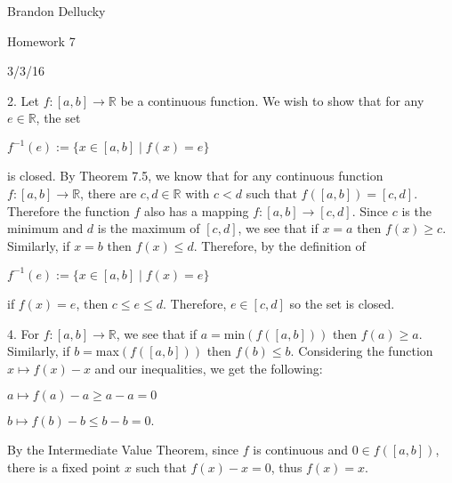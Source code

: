 \documentclass[12pt]{article}
\begin{document}
\centerline{Brandon Dellucky}
\centerline{Homework 7}
\centerline{3/3/16}
\centerline{}

2. Let $f: [a,b] \rightarrow  \mathbb{R}$ be a continuous function. We wish to show that for any $e \in \mathbb{R}$, the set\newline
\centerline{$f^{-1}(e):=\{x \in [a,b]\;|\;f(x) = e\}$}
is closed.
\newline
\newline
By Theorem 7.5, we know that for any continuous function $f:[a,b] \rightarrow  \mathbb{R}$, there are $c,d \in \mathbb{R}$ with $c < d$ such that $f([a,b])=[c,d].$ Therefore the function $f$ also has a mapping $f:[a,b] \rightarrow [c,d]$. Since $c$ is the minimum and $d$ is the maximum of $[c,d]$, we see that if $x=a$ then $f(x) \geq c$. Similarly, if $x=b$ then $f(x) \leq d$. Therefore, by the definition of 
\newline 
\centerline{}
\centerline{$f^{-1}(e):=\{x \in [a,b]\;|\;f(x) = e\}$}
\centerline{}
if $f(x) = e$, then $c \leq e \leq d$. Therefore, $e \in [c,d]$ so the set is closed.
\centerline{}
\centerline{}
4. For $f:[a,b] \rightarrow \mathbb{R}$, we see that if $a = $min$(f([a,b]))$ then $f(a) \geq a$. Similarly, if $b = $max$(f([a,b]))$ then $f(b) \leq b$. Considering the function $x \mapsto f(x) - x$ and our inequalities, we get the following:
\newline
\centerline{}
\centerline{$a \mapsto f(a) - a \geq a - a = 0$}
\centerline{$b \mapsto f(b) - b \leq b - b = 0.$}
\centerline{}
By the Intermediate Value Theorem, since $f$ is continuous and $0 \in f([a,b])$, there is a fixed point $x$ such that $f(x) - x = 0$, thus $f(x) = x$.
\centerline{}
\centerline{}
\end{document}
